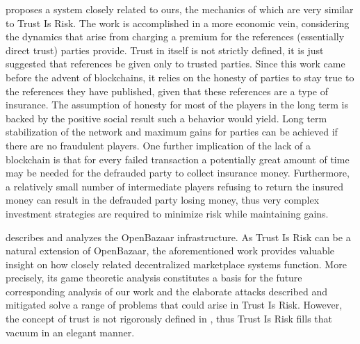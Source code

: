   \cite{davis} proposes a system closely related to ours, the mechanics of which are very similar to Trust Is Risk. The
  work is accomplished in a more economic vein, considering the dynamics that arise from charging a premium for the
  references (essentially direct trust) parties provide. Trust in itself is not strictly defined, it is just suggested that
  references be given only to trusted parties. Since this work came before the advent of blockchains, it relies on the
  honesty of parties to stay true to the references they have published, given that these references are a type of insurance.
  The assumption of honesty for most of the players in the long term is backed by the positive social result such a behavior
  would yield. Long term stabilization of the network and maximum gains for parties can be achieved if there are no
  fraudulent players. One further implication of the lack of a blockchain is that for every failed transaction a potentially
  great amount of time may be needed for the defrauded party to collect insurance money. Furthermore, a relatively small
  number of intermediate players refusing to return the insured money can result in the defrauded party losing money, thus
  very complex investment strategies are required to minimize risk while maintaining gains.

  \cite{dionyziz} describes and analyzes the OpenBazaar infrastructure. As Trust Is Risk can be a natural extension of
  OpenBazaar, the aforementioned work provides valuable insight on how closely related decentralized marketplace systems
  function. More precisely, its game theoretic analysis constitutes a basis for the future corresponding analysis of our
  work and the elaborate attacks described and mitigated solve a range of problems that could arise in Trust Is Risk.
  However, the concept of trust is not rigorously defined in \cite{dionyziz}, thus Trust Is Risk fills that vacuum in an
  elegant manner.
